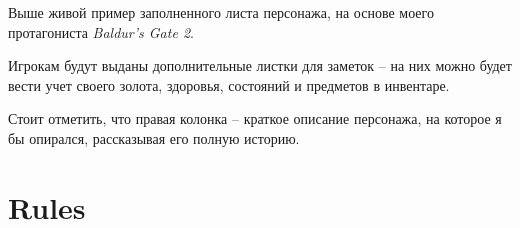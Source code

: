 \documentclass[a5paper,11pt]{book}
\begin{document}
\begin{multicols}{2}

Выше живой пример заполненного листа персонажа, на основе моего протагониста \emph{Baldur's Gate 2}.

Игрокам будут выданы дополнительные листки для заметок -- на них можно будет вести учет своего золота, здоровья, состояний и предметов в инвентаре.

Стоит отметить, что правая колонка -- краткое описание персонажа, на которое я бы опирался, рассказывая его полную историю.

\end{multicols}


\chapter{Rules}
\end{document}
